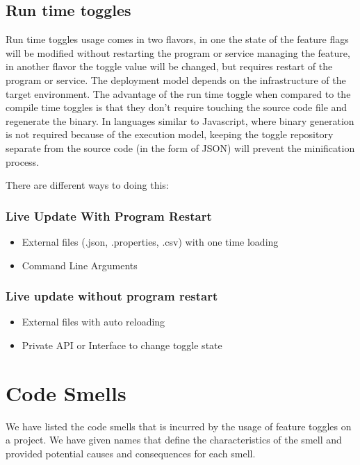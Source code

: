 \documentclass[conference]{IEEEtran}
\begin{document}
\subsection{Run time toggles}
Run time toggles usage comes in two flavors, in one the state of the feature flags will be modified without restarting the program or service managing the feature, in another flavor the toggle value will be changed, but requires restart of the program or service. The deployment model depends on the infrastructure of the target environment. The advantage of the run time toggle when compared to the compile time toggles is that they don’t require touching the source code file and regenerate the binary. In languages similar to Javascript, where binary generation is not required because of the execution model, keeping the toggle repository separate from the source code (in the form of JSON) will prevent the minification process.

There are different ways to doing this:

\subsubsection{Live Update With Program Restart}

\begin{itemize}
\item External files (.json, .properties, .csv) with one time loading
\item Command Line Arguments
\end{itemize}

\subsubsection{Live update without program restart}
\begin{itemize}
\item External files with auto reloading
\item Private API or Interface to change toggle state
\end{itemize}


\section{Code Smells}
\label{discussion}

We have listed the code smells that is incurred by the usage of feature toggles on a project. We have given names that define the characteristics of the smell and provided potential causes and consequences for each smell. 
\end{document}
